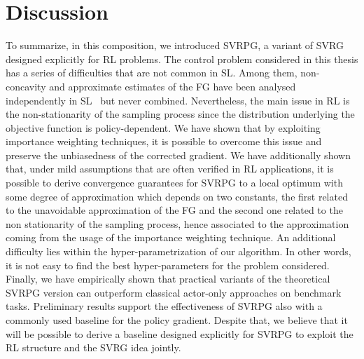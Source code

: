 \section{Discussion}
\vspace{-0.05in}
To summarize, in this composition, we introduced \acs{SVRPG}, a variant of \acs{SVRG} designed explicitly for \acs{RL} problems.
The control problem considered in this thesis has a series of difficulties that are not common in \acs{SL}.
Among them, non-concavity and approximate estimates of the \acs{FG} have been analysed independently in \acs{SL}~\citep[\eg][]{allen2016variance,reddi2016stochastic,harikandeh2015stopwasting} but never combined.
Nevertheless, the main issue in \acs{RL} is the non-stationarity of the sampling process since the distribution underlying the objective function is policy-dependent.
We have shown that by exploiting importance weighting techniques, it is possible to overcome this issue and preserve the unbiasedness of the corrected gradient.
We have additionally shown that, under mild assumptions that are often verified in \acs{RL} applications, it is possible to derive convergence guarantees for \acs{SVRPG} to a local optimum with some degree of approximation which depends on two constants, the first related to the unavoidable approximation of the \acs{FG} and the second one related to the non stationarity of the sampling process, hence associated to the approximation coming from the usage of the importance weighting technique.
\newline
An additional difficulty lies within the hyper-parametrization of our algorithm. In other words, it is not easy to find the best hyper-parameters for the problem considered.
Finally, we have empirically shown that practical variants of the theoretical \acs{SVRPG} version can outperform classical actor-only approaches on benchmark tasks.
Preliminary results support the effectiveness of \acs{SVRPG} also with a commonly used baseline for the policy gradient.
Despite that, we believe that it will be possible to derive a baseline designed explicitly for \acs{SVRPG} to exploit the \acs{RL} structure and the \acs{SVRG} idea jointly.
